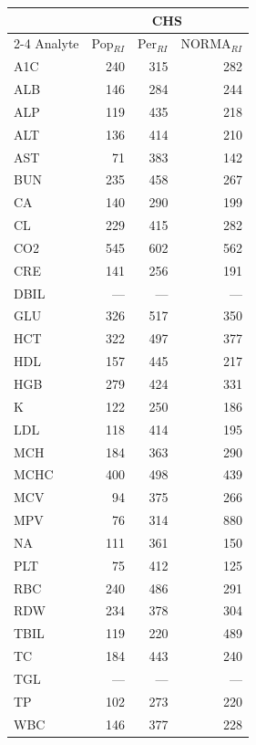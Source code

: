 \begin{table}[ht]
\centering
\footnotesize
\begin{tabular}{lrrr}
\toprule
 & \multicolumn{3}{c}{CHS} \\
\cmidrule(lr){2-4}
Analyte & Pop$_{RI}$ & Per$_{RI}$ & NORMA$_{RI}$ \\
\midrule
A1C & 240 & 315 & 282 \\
ALB & 146 & 284 & 244 \\
ALP & 119 & 435 & 218 \\
ALT & 136 & 414 & 210 \\
AST & 71 & 383 & 142 \\
BUN & 235 & 458 & 267 \\
CA & 140 & 290 & 199 \\
CL & 229 & 415 & 282 \\
CO2 & 545 & 602 & 562 \\
CRE & 141 & 256 & 191 \\
DBIL & --- & --- & --- \\
GLU & 326 & 517 & 350 \\
HCT & 322 & 497 & 377 \\
HDL & 157 & 445 & 217 \\
HGB & 279 & 424 & 331 \\
K & 122 & 250 & 186 \\
LDL & 118 & 414 & 195 \\
MCH & 184 & 363 & 290 \\
MCHC & 400 & 498 & 439 \\
MCV & 94 & 375 & 266 \\
MPV & 76 & 314 & 880 \\
NA & 111 & 361 & 150 \\
PLT & 75 & 412 & 125 \\
RBC & 240 & 486 & 291 \\
RDW & 234 & 378 & 304 \\
TBIL & 119 & 220 & 489 \\
TC & 184 & 443 & 240 \\
TGL & --- & --- & --- \\
TP & 102 & 273 & 220 \\
WBC & 146 & 377 & 228 \\
\bottomrule
\end{tabular}
\label{tab:07_prevalence_interpretable}
\end{table}
